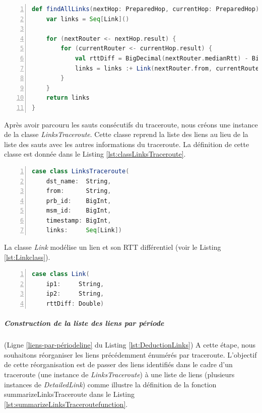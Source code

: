  \begin{lstlisting}[language=scala,firstnumber=1, caption={Définition de la fonction findAllLinks},label={lst:findAllLinksfunction}, basicstyle = \footnotesize,escapechar=|,numbers=left,
 stepnumber=1] 
  def findAllLinks(nextHop: PreparedHop, currentHop: PreparedHop): Seq[Link] = {
	var links = Seq[Link]()
	
	for (nextRouter <- nextHop.result) {
		for (currentRouter <- currentHop.result) {
			val rttDiff = BigDecimal(nextRouter.medianRtt) - BigDecimal(currentRouter.medianRtt)
			links = links :+ Link(nextRouter.from, currentRouter.from, rttDiff.toDouble)
		}
	}
	return links
}
\end{lstlisting}

Après avoir parcouru les sauts consécutifs du traceroute, nous créons une instance de la classe \textit{LinksTraceroute}. Cette classe reprend la liste des liens au lieu de la liste des sauts avec les autres informations du traceroute. La définition de cette classe est donnée dans le Listing \ref{lst:classLinksTraceroute}.
\begin{lstlisting}[language=scala,firstnumber=1, caption={Définition de la classe LinksTraceroute},label={lst:classLinksTraceroute}, basicstyle = \footnotesize,escapechar=|,numbers=left,
stepnumber=1] 
case class LinksTraceroute(
	dst_name:  String,
	from:      String,
	prb_id:    BigInt,
	msm_id:    BigInt,
	timestamp: BigInt,
	links:     Seq[Link])
\end{lstlisting}

La classe \textit{Link} modélise un lien et son RTT différentiel (voir le Listing \ref{lst:Linkclass}).
\begin{lstlisting}[language=scala,firstnumber=1, caption={Définition de la classe Link},label={lst:Linkclass}, basicstyle = \footnotesize,escapechar=|,numbers=left,
stepnumber=1] 
case class Link(
	ip1:     String,
	ip2:     String,
	rttDiff: Double)
\end{lstlisting}

\subparagraph{Construction de la liste des liens par période } (Ligne \ref{liens-par-périodeline} du Listing \ref{lst:DeductionLinks})
A cette étape, nous souhaitons réorganiser les liens précédemment énumérés par traceroute. L'objectif de cette réorganisation est de passer des liens identifiés dans le cadre d'un traceroute (une instance de \textit{LinksTraceroute}) à une liste de liens (plusieurs instances de \textit{DetailedLink}) comme illustre la définition de la fonction summarizeLinksTraceroute dans le Listing \ref{lst:summarizeLinksTraceroutefunction}. 


